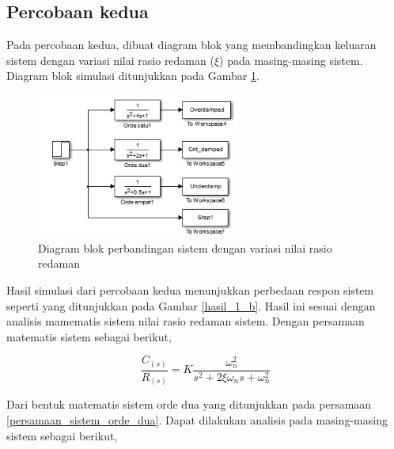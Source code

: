 \documentclass[../laporan]{subfiles}
\begin{document}
\subsection{Percobaan kedua}

Pada percobaan kedua, dibuat diagram blok yang membandingkan keluaran sistem dengan variasi nilai rasio redaman ($\xi$) pada masing-masing sistem. Diagram blok simulasi ditunjukkan pada Gambar \ref{soal_1_b}.

\begin{figure}[H]
    \centering
    \includegraphics[width = 0.6\textwidth]{figure/soal_1_b.png}
    \caption{Diagram blok perbandingan sistem dengan variasi nilai rasio redaman}
    \label{soal_1_b}
\end{figure}

Hasil simulasi dari percobaan kedua menunjukkan perbedaan respon sistem seperti yang ditunjukkan pada Gambar \ref{hasil_1_b}. Hasil ini sesuai dengan analisis mamematis sistem nilai rasio redaman sistem. Dengan persamaan matematis sistem sebagai berikut,

\begin{equation}
    \frac{C_{(s)}}{R_{(s)}} = K\frac{\omega_n^2}{s^2+2\xi\omega_n s+\omega_{n}^2}
    \label{persamaan_sistem_orde_dua}
\end{equation}

Dari bentuk matematis sistem orde dua yang ditunjukkan pada persamaan \eqref{persamaan_sistem_orde_dua}. Dapat dilakukan analisis pada masing-masing sistem sebagai berikut,
\end{document}
